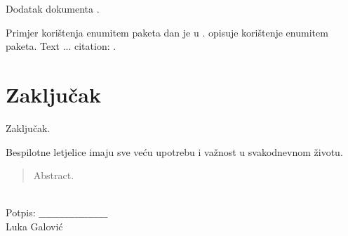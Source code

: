 \documentclass[times, utf8, diplomski]{fer}
\begin{document}
Dodatak dokumenta .

Primjer korištenja enumitem paketa dan je u \citep{collins2008enum}.
\citet{collins2008enum} opisuje korištenje enumitem paketa.
\cite{greenwade93}
Text ... citation: \cite{greenwade93}.

\chapter{Zaključak}
Zaključak.




\begin{sazetak}
Bespilotne letjelice imaju sve veću upotrebu i važnost u svakodnevnom životu. 

\end{sazetak}

\begin{abstract}
Abstract.

\end{abstract}\\

\hspace*{0pt}\hfill Potpis:  $\_\_\_\_\_\_\_\_\_\_\_\_\_\_\_\_\_\_\_\_\_$\\
\hspace*{5pt}\hfill Luka Galović
\end{document}

